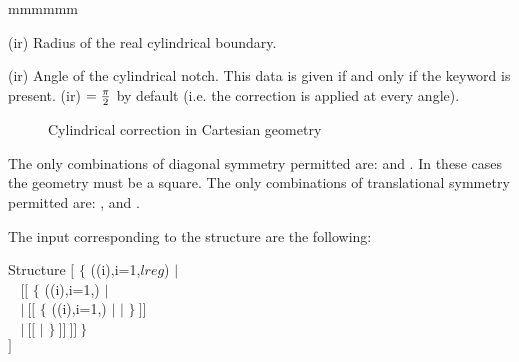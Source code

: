 \begin{ListeDeDescription}{mmmmmm}
\item[\dusa{rrad}(ir)] Radius of the real cylindrical boundary.

\item[\dusa{ang}(ir)] Angle of the cylindrical notch. This data is given if and only if the keyword  is present. (ir) $= {\pi \over 2}$ by default (i.e. the correction is applied at every angle).

\begin{figure}[htbp]
\begin{center} 
\epsfxsize=5cm
\centerline{ }
\parbox{14cm}{\caption{Cylindrical correction in Cartesian geometry}
\label{fig:corr}} 
\end{center} 
\end{figure}

\end{ListeDeDescription}
 
The only combinations of diagonal symmetry permitted are:     and    . In these cases the geometry must be a square. The only combinations of translational symmetry permitted are:    ,     and    .

\vskip 0.2cm
\goodbreak

The input corresponding to the  structure are the following:

\begin{DataStructure}{Structure }
$[$  $\{$  ((i),i=1,$lreg$) $|$\\
$~~~~[[$   $\{$ ((i),i=1,) $|$  \\
$~~~~|~[[$  $\{$ ((i),i=1,) $|$   $|$   $\}~]]$\\
$~~~~|~[[$     $|$   $\}~]]~]]~\}$\\
$]$
\end{DataStructure}

\noindent

